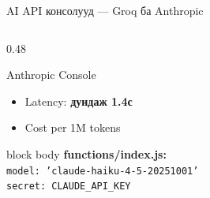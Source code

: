 \documentclass[14pt,aspectratio=169]{beamer}
\begin{document}
\begin{frame}{AI API консолууд — Groq ба Anthropic}
\begin{columns}[T]
\begin{column}{0.48\textwidth}
\begin{block}{Anthropic Console}
\begin{itemize}
          \item Latency: \textbf{дундаж 1.4с}
          \item Cost per 1M tokens
        \end{itemize}
        \vspace{4pt}
        \begin{beamercolorbox}[sep=3pt,rounded=true]{block body}
          \tiny\textbf{functions/index.js:}\\
          \texttt{model: 'claude-haiku-4-5-20251001'}\\
          \texttt{secret: CLAUDE\_API\_KEY}
        \end{beamercolorbox}
      \end{block}
    \end{column}
  \end{columns}
\end{frame}
\end{document}
